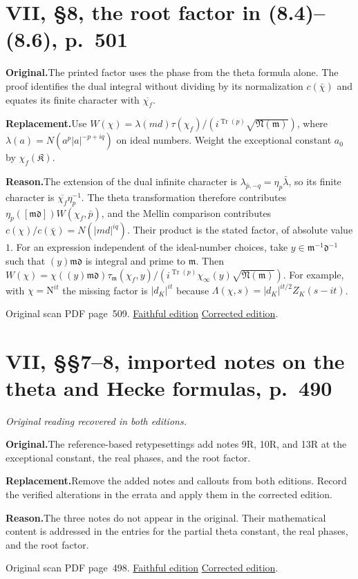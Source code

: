 \documentclass[11pt,a4paper]{article}
\newcommand{\original}{\par\smallskip\noindent\textbf{Original.}\enspace}
\newcommand{\replacement}{\par\smallskip\noindent\textbf{Replacement.}\enspace}
\newcommand{\reason}{\par\smallskip\noindent\textbf{Reason.}\enspace}
\newcommand{\editionlink}[3]{\href{#1\#errata.#2}{#3}}
\newcommand{\location}[2]{%
  \par\smallskip\noindent Original scan PDF page~#2.\enspace
  \editionlink{Neukirch_Faithful.pdf}{#1}{Faithful edition}
  \quad\editionlink{Neukirch_Corrected.pdf}{#1}{Corrected edition}.}
\begin{document}
\setcounter{section}{207}
\section{VII, \S8, the root factor in (8.4)--(8.6), p.~501}\label{errata:item:208}

\original The printed factor uses the phase from the theta formula alone. The proof identifies the dual integral without dividing by its normalization $c(\bar\chi)$ and equates its finite character with $\overline{\chi_f}$.
\replacement Use $W(\chi)=\lambda(md)\tau(\chi_f)/(i^{\operatorname{Tr}(p)}\sqrt{\mathfrak N(\mathfrak m)})$, where $\lambda(a)=N(a^p|a|^{-p+iq})$ on ideal numbers. Weight the exceptional constant $a_0$ by $\chi_f(\mathfrak K)$.
\reason The extension of the dual infinite character is $\lambda_{\bar p,-q}=\eta_p\bar\lambda$, so its finite character is $\overline{\chi_f}\eta_p^{-1}$. The theta transformation therefore contributes $\eta_p([\mathfrak m\mathfrak d])W(\chi_f,\bar p)$, and the Mellin comparison contributes $c(\chi)/c(\bar\chi)=N(|md|^{iq})$. Their product is the stated factor, of absolute value $1$. For an expression independent of the ideal-number choices, take $y\in\mathfrak m^{-1}\mathfrak d^{-1}$ such that $(y)\mathfrak m\mathfrak d$ is integral and prime to $\mathfrak m$. Then $W(\chi)=\chi((y)\mathfrak m\mathfrak d)\tau_{\mathfrak m}(\chi_f,y)/(i^{\operatorname{Tr}(p)}\chi_\infty(y)\sqrt{\mathfrak N(\mathfrak m)})$. For example, with $\chi=\mathrm N^{it}$ the missing factor is $|d_K|^{it}$ because $\Lambda(\chi,s)=|d_K|^{it/2}Z_K(s-it)$.
\location{208}{509}

\setcounter{section}{208}
\section{VII, \S\S7--8, imported notes on the theta and Hecke formulas, p.~490}\label{errata:item:209}
\noindent\emph{Original reading recovered in both editions.}\par
\original The reference-based retypesettings add notes 9R, 10R, and 13R at the exceptional constant, the real phases, and the root factor.
\replacement Remove the added notes and callouts from both editions. Record the verified alterations in the errata and apply them in the corrected edition.
\reason The three notes do not appear in the original. Their mathematical content is addressed in the entries for the partial theta constant, the real phases, and the root factor.
\location{209}{498}

\setcounter{section}{209}
\end{document}
